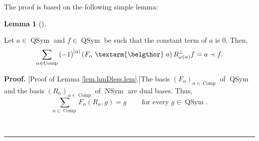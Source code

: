\documentclass
[numbers=enddot,12pt,final,onecolumn,notitlepage,abstracton]{scrartcl}%
\theoremstyle{definition}
\newtheorem{lem}[theo]{Lemma}
\newenvironment{lemma}[1][]
{\begin{lem}[#1]\begin{leftbar}}
{\end{leftbar}\end{lem}}
\newenvironment{proof}[1][Proof]{\noindent\textbf{#1.} }{\ \rule{0.5em}{0.5em}}
\newcommand{\bel}{\left. \textarm{\belgthor} \right.}
\let\sumnonlimits\sum
\renewcommand{\sum}{\sumnonlimits\limits}
\begin{document}
The proof is based on the following simple lemma:

\begin{lemma}
\label{lem.hmDless.lem}Let $a\in\operatorname*{QSym}$ and $f\in
\operatorname*{QSym}$ be such that the constant term of $a$ is $0$. Then,%
\[
\sum_{\alpha\in\operatorname*{Comp}}\left(  -1\right)  ^{\left\vert
\alpha\right\vert }\left(  F_{\alpha}\bel a\right)  R_{\omega\left(
\alpha\right)  }^{\perp}f=a\left.  \prec\right.  f.
\]

\end{lemma}

\begin{proof}
[Proof of Lemma \ref{lem.hmDless.lem}.]The basis $\left(  F_{\alpha}\right)
_{\alpha\in\operatorname*{Comp}}$ of $\operatorname*{QSym}$ and the basis
$\left(  R_{\alpha}\right)  _{\alpha\in\operatorname*{Comp}}$ of
$\operatorname*{NSym}$ are dual bases. Thus,%
\begin{equation}
\sum_{\alpha\in\operatorname*{Comp}}F_{\alpha}\left(  R_{\alpha},g\right)
=g\ \ \ \ \ \ \ \ \ \ \text{for every }g\in\operatorname*{QSym}.
\label{pf.lem.hmDless.lem.dualbases}%
\end{equation}



\end{proof}
\end{document}
